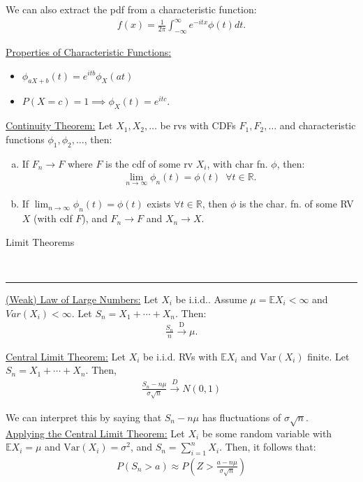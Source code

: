 \documentclass{article}
\newcommand{\header}[1]{\begin{large}\noindent #1\end{large}\\\rule{\textwidth}{0.5pt}}
\newcommand{\sheader}[1]{\underline{#1:}}
\newcommand{\gap}{\medskip\\}
\newcommand{\ds}{\displaystyle}
\begin{document}
We can also extract the pdf from a characteristic function:
\begin{align*}
    f(x) = \frac{1}{2\pi}\int_{-\infty}^{\infty} e^{-itx} \phi(t)dt.
\end{align*}

\sheader{Properties of Characteristic Functions}
\begin{itemize}
    \item $\ds\phi_{aX + b} (t) = e^{itb}\phi_X(at)$
    \item $P(X = c) = 1 \implies \phi_X(t) = e^{itc}$.
\end{itemize}

\sheader{Continuity Theorem} Let $X_1, X_2, \ldots $ be rvs with 
CDFs $F_1, F_2, \ldots$ and characteristic functions $\phi_1, \phi_2, \ldots$,
then:
\begin{enumerate}[(a)]
    \item If $F_n \to F$ where $F$ is the cdf of some rv $X_i$, 
    with char fn. $\phi$, then:
    \begin{align*}
        \lim_{n \to \infty}\phi_n(t) = \phi(t)\,\,\, \forall t \in \mathbb{R}.
    \end{align*}
    \item If $\ds \lim_{n \to \infty} \phi_n(t)= \phi(t)$ exists $\forall t \in \mathbb{R}$,
    then $\phi$ is the char. fn. of some RV $X$ (with cdf $F$), and 
    $F_n \to F$ and $X_n \to X$.
\end{enumerate}

\header{Limit Theorems}

\sheader{(Weak) Law of Large Numbers} Let $X_i$ be i.i.d.. Assume 
$\mu = \mathbb{E}X_i < \infty$ and $Var(X_i) < \infty$. Let $S_n = X_1 + \cdots + X_n$.
Then:
\begin{align*}
    \frac{S_n}{n} \xrightarrow{\text{D}} \mu.
\end{align*}

\pagebreak

\sheader{Central Limit Theorem} Let $X_i$ be i.i.d. RVs with 
$\mathbb{E}X_i$ and $\textrm{Var}(X_i)$ finite. Let $S_n = X_1 + \cdots + X_n$.
Then,
\begin{align*}
    \frac{S_n - n \mu }{\sigma \sqrt{n}} \xrightarrow{D} N(0, 1)
\end{align*}

We can interpret this by saying that $S_n - n\mu $ has fluctuations of 
$\sigma \sqrt{n}$.
\gap
\sheader{Applying the Central Limit Theorem} Let $X_i$ be some random variable 
with $\mathbb{E}X_i = \mu$ and $\textrm{Var}(X_i) = \sigma^2$, and $S_n = \sum_{i=1}^{n}X_i$. 
Then, it follows that:
\begin{align*}
    P(S_n > a) \approx P\left(Z > \frac{a - n \mu}{\sigma \sqrt{n}}\right)
\end{align*}
\end{document}
